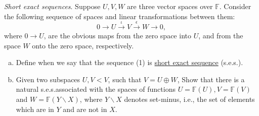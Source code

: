 \documentclass{article}
\begin{document}
\begin{problem}
    \textit{Short exact sequences}. Suppose $U,V,W$ are three vector spaces over $\mathbb{F}$. Consider the following sequence of spaces and linear transformations between them:
    \begin{equation}
        0 \xrightarrow{} U \xrightarrow{\iota} V \xrightarrow{\epsilon} W \xrightarrow{} 0,
    \end{equation}
    where $0 \to U$, are the obvious maps from the zero space into $U$, and from the space $W$ onto the zero space, respectively. \\
    \begin{enumerate}[a)]
        \item Define when we say that the sequence (1) is \underline{short exact sequence} (s.e.s.).
        \item Given two subspaces $U,V < V$, such that $V = U \oplus W$, Show that there is a natural s.e.s.associated with the spaces of functions $U = \mathbb{F}(U), V = \mathbb{F}(V)$ and $W = \mathbb{F}(Y \backslash X)$, where $Y \backslash X$ denotes set-minus, i.e., the set of elements which are in $Y$ and are not in $X$.
    \end{enumerate}
\end{problem}
\end{document}

